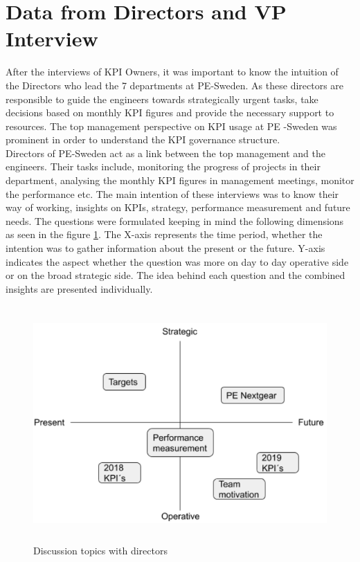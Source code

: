 \section{Data from Directors and VP Interview}

After the interviews of KPI Owners, it was important to know the intuition of the Directors who lead the 7 departments at PE-Sweden. As these directors are responsible to guide the engineers towards strategically urgent tasks, take decisions based on monthly KPI figures and provide the necessary support to resources. The top management perspective on KPI usage at PE -Sweden was prominent in order to understand the KPI governance structure.\\

Directors of PE-Sweden act as a link between the top management and the engineers. Their tasks include, monitoring the progress of projects in their department, analysing the monthly KPI figures in management meetings, monitor the performance etc. The main intention of these interviews was to know their way of working, insights on KPIs, strategy, performance measurement and future needs. The questions were formulated keeping in mind the following dimensions as seen in the figure \ref{fig:5.4}. The X-axis represents the time period, whether the intention was to gather information about the present or the future. Y-axis indicates the aspect whether the question was more on day to day operative side or on the broad strategic side. The idea behind each question and the combined insights are presented individually.
    \begin{figure}[H]
    \centering
    \captionsetup{justification=centering, margin=2cm}
    \vspace{1cm}
    \includegraphics[width=12cm, height=9cm]{figure/auxiliary/fig54.PNG}
    \caption{ Discussion topics with directors}
    \label{fig:5.4}
\end{figure}

